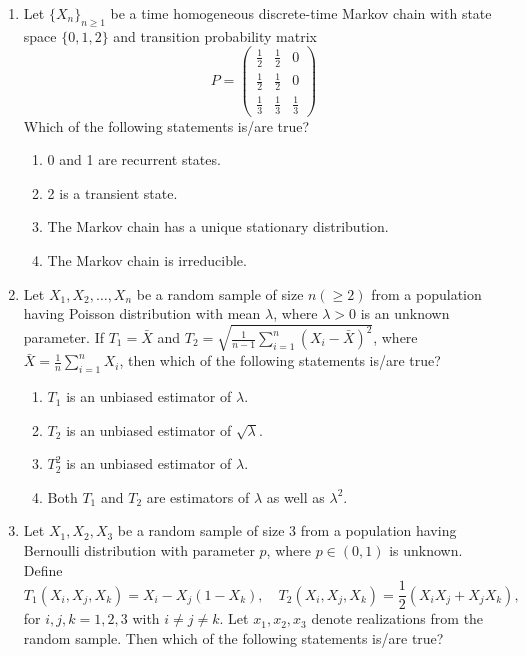 \documentclass[journal,12pt,onecolumn]{IEEEtran}
\theoremstyle{remark}
\begin{document}
\renewcommand{\thetable}{\theenumi}
\begin{enumerate}
    \item Let $\{X_n\}_{n \geq 1}$ be a time homogeneous discrete-time Markov chain with state space $\{0, 1, 2\}$ and transition probability matrix
\[
    P = \begin{pmatrix} 
        \frac{1}{2} & \frac{1}{2} & 0 \\ 
        \frac{1}{2} & \frac{1}{2} & 0 \\ 
        \frac{1}{3} & \frac{1}{3} & \frac{1}{3} 
    \end{pmatrix}
\]
    Which of the following statements is/are true?
    \begin{enumerate}
        \item 0 and 1 are recurrent states.
        \item 2 is a transient state.
        \item The Markov chain has a unique stationary distribution.
        \item The Markov chain is irreducible.
    \end{enumerate}
    \item Let $X_1, X_2, \dots, X_n$ be a random sample of size $n (\geq 2)$ from a population having Poisson distribution with mean $\lambda$, where $\lambda > 0$ is an unknown parameter. If $T_1 = \bar{X}$ and $T_2 = \sqrt{\frac{1}{n-1} \sum_{i=1}^{n} (X_i - \bar{X})^2}$, where $\bar{X} = \frac{1}{n} \sum_{i=1}^{n} X_i$, then which of the following statements is/are true?
    \begin{enumerate}
        \item $T_1$ is an unbiased estimator of $\lambda$.
        \item $T_2$ is an unbiased estimator of $\sqrt{\lambda}$.
        \item $T_2^2$ is an unbiased estimator of $\lambda$.
        \item Both $T_1$ and $T_2$ are estimators of $\lambda$ as well as $\lambda^2$.
    \end{enumerate}
    \item Let $X_1, X_2, X_3$ be a random sample of size 3 from a population having Bernoulli distribution with parameter $p$, where $p \in (0,1)$ is unknown. Define
\[
    T_1(X_i, X_j, X_k) = X_i - X_j(1 - X_k), \quad T_2(X_i, X_j, X_k) = \frac{1}{2} (X_i X_j + X_j X_k),
\]
    for $i, j, k = 1, 2, 3$ with $i \neq j \neq k$. Let $x_1, x_2, x_3$ denote realizations from the random sample. Then which of the following statements is/are true?

\end{enumerate}
\end{document}
